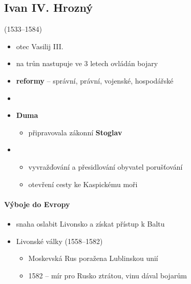 \subsection{Ivan IV. Hrozný} (1533--1584)
\begin{itemize}
\item otec Vasilij III.
\item na trůn nastupuje ve 3 letech \ra ovládán bojary
\item \textbf{reformy} -- správní, právní, vojenské, hospodářské
\item {}
\item {} \textbf{Duma}
	\begin{itemize}
	\item připravovala zákonní \textbf{Stoglav}
	\end{itemize}
\item {}
	\begin{itemize}
	\item vyvražďování a přesidlování obyvatel \ra porušťování
	\item otevření cesty ke Kaspickému moři
	\end{itemize}
\end{itemize}

\paragraph{Výboje do Evropy}
\begin{itemize}
\item snaha oslabit Livonsko a získat přístup k Baltu
\item Livonské války (1558--1582)
	\begin{itemize}
	\item Moskevská Rus poražena Lublinskou unií
	\item 1582 -- mír pro Rusko ztrátou, vinu dával bojarům
	\end{itemize}
\end{itemize}

